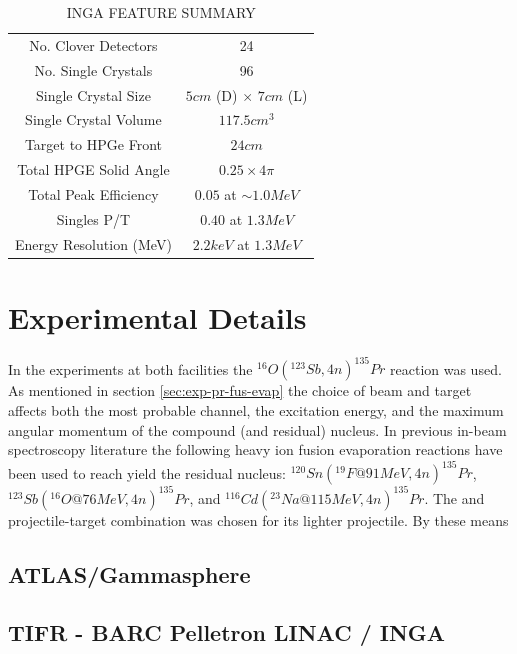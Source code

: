 \begin{table}[h]
\caption{INGA FEATURE SUMMARY\label{tbl:inga-summary}}
\begin{center}
\begin{tabular}{|c|c|}
\hline
\hline
No. Clover Detectors      & 24\\ 
No. Single Crystals       & 96\\ 
Single Crystal Size       & $5 cm$ (D) $\times$ $7 cm$ (L) \\
Single Crystal Volume     & $117.5 cm^3$\\
Target to HPGe Front      & $24 cm$\\ 
Total HPGE Solid Angle    & $0.25 \times 4\pi$\\ 
Total Peak Efficiency     & $0.05$ at $\sim1.0 MeV$\\ 
Singles P/T               & $0.40$ at $1.3 MeV$ \\ 
Energy Resolution (MeV)   & $2.2keV$ at $1.3 MeV$ \\ 
\hline 
\hline 
\end{tabular}
\end{center}
\end{table}

\section{Experimental Details}
\label{sec:exp-pr-details}
In the experiments at both facilities the $^{16}O(^{123}Sb,4n)^{135}Pr$ reaction was used. As mentioned in section \ref{sec:exp-pr-fus-evap} the choice of beam and target affects both the most probable channel, the excitation energy, and the maximum angular momentum of the compound (and residual) nucleus. In previous in-beam \gr{} spectroscopy literature the following heavy ion fusion evaporation reactions have been used to reach yield the \pr{} residual nucleus: $^{120}Sn(^{19}F @ 91MeV,4n)^{135}Pr$\cite{Semkow135Pr}, $^{123}Sb(^{16}O @ 76MeV,4n)^{135}Pr$\cite{135PrLifetimes}, and  $^{116}Cd(^{23}Na @ 115MeV,4n)^{135}Pr$\cite{EPaul135Pr}. The  and  projectile-target combination was chosen for its lighter projectile. By these means
\subsection{ATLAS/Gammasphere}
\label{ssec:exp-pr-details-gs}
\subsection{TIFR - BARC Pelletron LINAC / INGA}
\label{ssec:exp-pr-details-inga}


